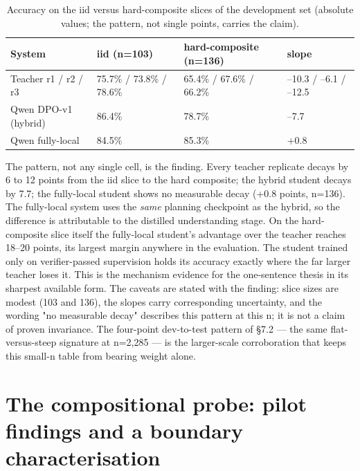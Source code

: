 \begin{table}[t]
\centering
\small
\caption{Accuracy on the iid versus hard-composite slices of the development set (absolute values; the pattern, not single points, carries the claim).}
\label{tab:07_analysis_1}
\begin{tabular}{llll}
\toprule
System & iid (n=103) & hard-composite (n=136) & slope \\
\midrule
Teacher r1 / r2 / r3 & 75.7\% / 73.8\% / 78.6\% & 65.4\% / 67.6\% / 66.2\% & --10.3 / --6.1 / --12.5 \\
Qwen DPO-v1 (hybrid) & 86.4\% & 78.7\% & --7.7 \\
Qwen fully-local & 84.5\% & 85.3\% & +0.8 \\
\bottomrule
\end{tabular}
\end{table}


The pattern, not any single cell, is the finding. Every teacher replicate decays by 6 to 12 points from the iid slice to the hard composite; the hybrid student decays by 7.7; the fully-local student shows no measurable decay (+0.8 points, n=136). The fully-local system uses the \emph{same} planning checkpoint as the hybrid, so the difference is attributable to the distilled understanding stage. On the hard-composite slice itself the fully-local student's advantage over the teacher reaches 18--20 points, its largest margin anywhere in the evaluation. The student trained only on verifier-passed supervision holds its accuracy exactly where the far larger teacher loses it. This is the mechanism evidence for the one-sentence thesis in its sharpest available form. The caveats are stated with the finding: slice sizes are modest (103 and 136), the slopes carry corresponding uncertainty, and the wording "no measurable decay" describes this pattern at this n; it is not a claim of proven invariance. The four-point dev-to-test pattern of \S7.2 --- the same flat-versus-steep signature at n=2,285 --- is the larger-scale corroboration that keeps this small-n table from bearing weight alone.

\section{The compositional probe: pilot findings and a boundary characterisation}\label{sec:the-compositional-probe-pilot-findings-a}

